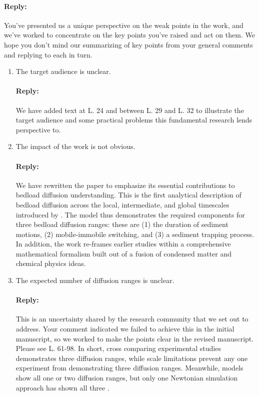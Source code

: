 \documentclass[11pt]{article}
\begin{document}
\paragraph{Reply:}
You've presented us a unique perspective on the weak points in the work, and we've worked to concentrate on the key points you've raised and act on them.
We hope you don't mind our summarizing of key points from your general comments and replying to each in turn. 
\begin{enumerate} 
\item The target audience is unclear.
\paragraph{Reply:}
We have added text at L. 24 and between L. 29 and L. 32 to illustrate the target audience and some practical problems this fundamental research lends perspective to.

\item The impact of the work is not obvious.
\paragraph{Reply:}
We have rewritten the paper to emphasize its essential contributions to bedload diffusion understanding. This is the first analytical description of bedload diffusion across the local, intermediate, and global timescales introduced by \citet{Nikora2001a}. The model thus demonstrates the required components for three bedload diffusion ranges: these are (1) the duration of sediment motions, (2) mobile-immobile switching, and (3) a sediment trapping process.
In addition, the work re-frames earlier studies \citep[e.g.,][]{Wu2019,Lisle1998,Lajeunesse2018,Einstein1937} within a comprehensive mathematical formalism built out of a fusion of condensed matter \citep[e.g.,][]{Weiss1994} and chemical physics \citep[e.g.][]{Schmidt2007} ideas. 

\item The expected number of diffusion ranges is unclear.
\paragraph{Reply:}
This is an uncertainty shared by the research community that we set out to address. Your comment indicated we failed to achieve this in the initial manuscript, so we worked to make the points clear in the revised manuscript. Please see L. 61-98. In short, cross comparing experimental studies demonstrates three diffusion ranges, while scale limitations prevent any one experiment from demonstrating three diffusion ranges. Meanwhile, models show all one or two diffusion ranges, but only one Newtonian simulation approach has shown all three \citep{Bialik2012}. 


\end{enumerate}
\end{document}
